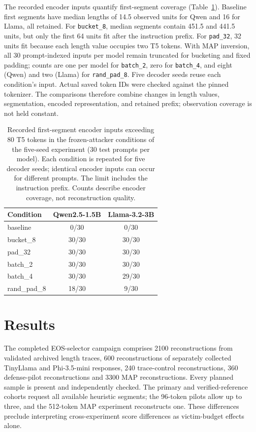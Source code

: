 \documentclass[electronics,article,submit,pdftex,moreauthors]{Definitions/mdpi}
\begin{document}
The recorded encoder inputs quantify first-segment coverage (Table~\ref{tab:encoder_coverage}). Baseline first segments have median lengths of 14.5 observed units for Qwen and 16 for Llama, all retained. For \texttt{bucket\_8}, median segments contain 451.5 and 441.5 units, but only the first 64 units fit after the instruction prefix. For \texttt{pad\_32}, 32 units fit because each length value occupies two T5 tokens. With MAP inversion, all 30 prompt-indexed inputs per model remain truncated for bucketing and fixed padding; counts are one per model for \texttt{batch\_2}, zero for \texttt{batch\_4}, and eight (Qwen) and two (Llama) for \texttt{rand\_pad\_8}. Five decoder seeds reuse each condition's input. Actual saved token IDs were checked against the pinned tokenizer. The comparisons therefore combine changes in length values, segmentation, encoded representation, and retained prefix; observation coverage is not held constant.

\begin{table}[ht]
\centering
\caption{Recorded first-segment encoder inputs exceeding 80 T5 tokens in the frozen-attacker conditions of the five-seed experiment (30 test prompts per model). Each condition is repeated for five decoder seeds; identical encoder inputs can occur for different prompts. The limit includes the instruction prefix. Counts describe encoder coverage, not reconstruction quality.}
\label{tab:encoder_coverage}
\begin{tabular}{l c c}
\toprule
Condition & Qwen2.5-1.5B & Llama-3.2-3B \\
\midrule
baseline & 0/30 & 0/30 \\
bucket\_8 & 30/30 & 30/30 \\
pad\_32 & 30/30 & 30/30 \\
batch\_2 & 30/30 & 30/30 \\
batch\_4 & 30/30 & 29/30 \\
rand\_pad\_8 & 18/30 & 9/30 \\
\bottomrule
\end{tabular}
\end{table}

\section{Results}
The completed EOS-selector campaign comprises 2100 reconstructions from validated archived length traces, 600 reconstructions of separately collected TinyLlama and Phi-3.5-mini responses, 240 trace-control reconstructions, 360 defense-pilot reconstructions and 3300 MAP reconstructions. Every planned sample is present and independently checked. The primary and verified-reference cohorts request all available heuristic segments; the 96-token pilots allow up to three, and the 512-token MAP experiment reconstructs one. These differences preclude interpreting cross-experiment score differences as victim-budget effects alone.
\end{document}
